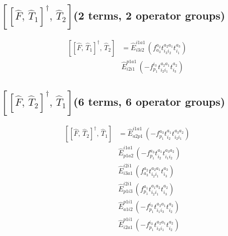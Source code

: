 \documentclass[11pt]{article}
\begin{document}
\subsection*{$\left[\left[\hat{F},\, \hat{T}_{1}\right]^{\dagger},\, \hat{T}_{2}\right]$\quad(2 terms, 2 operator groups)}
\begin{align}
\left[\left[\hat{F},\, \hat{T}_{1}\right]^{\dagger},\, \hat{T}_{2}\right] &= \hat{E}^{i1a1}_{i3i2}\,\left(f^{a_{2}}_{a_{3}} t^{a_{2}a_{1}}_{i_{3}i_{2}} t^{a_{3}}_{i_{1}} \right) \\
&\hat{E}^{p1a1}_{i2i1}\,\left(- f^{i_{3}}_{p_{1}} t^{a_{2}a_{1}}_{i_{2}i_{1}} t^{a_{2}}_{i_{3}} \right)
\end{align}
\subsection*{$\left[\left[\hat{F},\, \hat{T}_{2}\right]^{\dagger},\, \hat{T}_{1}\right]$\quad(6 terms, 6 operator groups)}
\begin{align}
\left[\left[\hat{F},\, \hat{T}_{2}\right]^{\dagger},\, \hat{T}_{1}\right] &= \hat{E}^{i1a1}_{a2p1}\,\left(- f^{a_{3}}_{p_{1}} t^{a_{1}}_{i_{2}} t^{a_{3}a_{2}}_{i_{2}i_{1}} \right) \\
&\hat{E}^{i1a1}_{p1a2}\,\left(- f^{a_{3}}_{p_{1}} t^{a_{1}}_{i_{2}} t^{a_{3}a_{2}}_{i_{1}i_{2}} \right) \\
&\hat{E}^{i2i1}_{i3a1}\,\left(f^{a_{2}}_{a_{3}} t^{a_{2}a_{1}}_{i_{2}i_{1}} t^{a_{3}}_{i_{3}} \right) \\
&\hat{E}^{i2i1}_{p1i3}\,\left(f^{a_{1}}_{p_{1}} t^{a_{1}a_{2}}_{i_{2}i_{1}} t^{a_{2}}_{i_{3}} \right) \\
&\hat{E}^{p1i1}_{a1i2}\,\left(- f^{i_{3}}_{p_{1}} t^{a_{2}a_{1}}_{i_{1}i_{3}} t^{a_{2}}_{i_{2}} \right) \\
&\hat{E}^{p1i1}_{i2a1}\,\left(- f^{i_{3}}_{p_{1}} t^{a_{2}a_{1}}_{i_{3}i_{1}} t^{a_{2}}_{i_{2}} \right)
\end{align}
\end{document}

